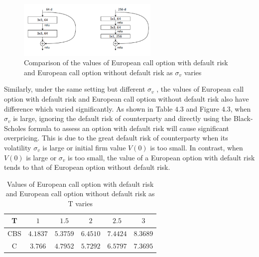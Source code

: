 \documentclass[pdf]{beamer}
\begin{document}
\begin{frame}[allowframebreaks]
\begin{figure}[hp]
	\includegraphics[width=0.60\textwidth]{png/bottleneck.png}
	\caption{Comparison of the values of European call option with default risk and European call option without default risk as $\sigma_{v}$ varies}
	\label{fig:ife3}
\end{figure}
\small
Similarly, under the same setting but different  $\sigma_{v}$ , the values of European call option with default risk and European call option without default risk also have difference which varied significantly. As shown in Table $4.3$ and Figure $4.3$, when $\sigma_{v}$ is large, ignoring the default risk of counterparty and directly using the Black-Scholes formula to assess an option with default risk will cause significant overpricing. This is due to the great default risk of counterparty when its volatility $\sigma_{v}$ is large or initial firm value $V(0)$ is too small. In contrast, when $V(0)$ is large or $\sigma_{v}$ is too small, the value of a European option with default risk tends to that of European option without default risk.
\end{frame}
\begin{frame}[allowframebreaks]
\begin{table}
\small\addtolength{\tabcolsep}{-5pt}
\begin{tabular}{c|c|c|c|c|c}
T & $1$ & $1.5$ & $2$ & $2.5$ & $3$\\
\hline 
CBS & $4.1837$ & $5.3759$ & $6.4510$ & $7.4424$ & $8.3689$\\
\hline
C & $3.766$ & $4.7952$ & $5.7292$ & $6.5797$ & $7.3695$\\
\end{tabular}
\caption{Values of European call option with default risk and European call option without default risk as T varies}
\end{table}
\end{frame}
\end{document}
